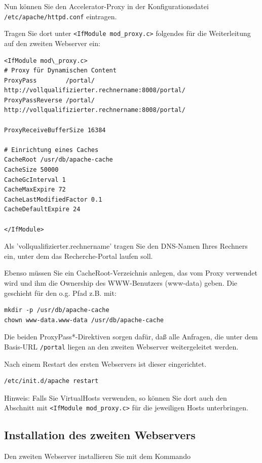 \documentclass[11pt, twoside, a4paper, BCOR8mm, DIV12, bibtotoc,idxtotoc]{scrbook}
\begin{document}
Nun können Sie den Accelerator-Proxy in der Konfigurationsdatei
\texttt{/etc/apache/httpd.conf} eintragen.

Tragen Sie dort unter \texttt{<IfModule mod\_proxy.c>} folgendes für die
Weiterleitung auf den zweiten Webserver ein:

\begin{verbatim}
<IfModule mod\_proxy.c>
# Proxy für Dynamischen Content
ProxyPass        /portal/ http://vollqualifizierter.rechnername:8008/portal/
ProxyPassReverse /portal/ http://vollqualifizierter.rechnername:8008/portal/

ProxyReceiveBufferSize 16384

# Einrichtung eines Caches
CacheRoot /usr/db/apache-cache
CacheSize 50000
CacheGcInterval 1
CacheMaxExpire 72
CacheLastModifiedFactor 0.1
CacheDefaultExpire 24

</IfModule>
\end{verbatim}

Als 'vollqualifizierter.rechnername' tragen Sie den DNS-Namen Ihres
Rechners ein, unter dem das Recherche-Portal laufen soll.

Ebenso müssen Sie ein CacheRoot-Verzeichnis anlegen, das vom Proxy
verwendet wird und ihm die Ownership des WWW-Benutzers (www-data)
geben. Die geschieht für den o.g. Pfad z.B. mit:

\begin{verbatim}
mkdir -p /usr/db/apache-cache
chown www-data.www-data /usr/db/apache-cache
\end{verbatim}

Die beiden ProxyPass*-Direktiven sorgen dafür, daß alle Anfragen,
die unter dem Basis-URL \texttt{/portal} liegen an den zweiten Webserver
weitergeleitet werden.

Nach einem Restart des ersten Webservers ist dieser eingerichtet.

\begin{verbatim}
/etc/init.d/apache restart
\end{verbatim}


Hinweis: Falls Sie VirtualHosts verwenden, so können Sie dort auch
den Abschnitt mit \texttt{<IfModule mod\_proxy.c>} für die jeweiligen Hosts
unterbringen.


\subsection{Installation des zweiten Webservers}

Den zweiten Webserver installieren Sie mit dem Kommando
\end{document}
